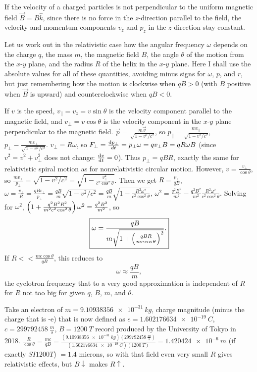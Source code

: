 If the velocity of a charged particles is not perpendicular to the uniform magnetic field $\vec{B} = B\hat{k}$, since there is no force in the $z$-direction parallel to the field, the velocity and momentum components $v_z$ and $p_z$ in the $z$-direction stay constant.

Let us work out in the relativistic case how the angular frequency $\omega$ depends on the charge $q$, the mass $m$, the magnetic field $B$, the angle $\theta$ of the motion from the $x$-$y$ plane, and the radius $R$ of the helix in the $x$-$y$ plane. Here I shall use the absolute values for all of these quantities, avoiding minus signs for $\omega$, $p$, and $r$, but just remembering how the motion is clockwise when $qB > 0$ (with $B$ positive when $\vec{B}$ is upward) and counterclockwise when $qB < 0$.

If $v$ is the speed, $v_{\parallel} = v_z = v\sin\theta$ is the velocity component parallel to the magnetic field, and $v_\bot = v\cos\theta$ is the velocity component in the $x$-$y$ plane perpendicular to the magnetic field. $\vec{p} = \frac{m\vec{v}}{\sqrt{1-v^2/c^2}}$, so $p_\parallel = \frac{mv_\parallel}{\sqrt{1 - v^2/c^2}}$, $p_\bot - \frac{mv_\bot}{\sqrt{1-v^2/c^2}}$. $v_\bot = R\omega$, so $F_\bot = \frac{\operatorname{d\!} p_\bot}{dt} = p_\bot \omega = qv_\bot B = qR\omega B$ (since $v^2 = v_\parallel^2 + v_\bot^2$ does not change: $\frac{\operatorname{d\!} v}{\operatorname{d\!} t} = 0$). Thus $p_\bot = qBR$, exactly the same for relativistic spiral motion as for nonrelativistic circular motion. However, $v = \frac{v_\bot}{\cos\theta}$, so $\frac{mv_\bot}{p_\bot} = \sqrt{ 1 - v^2/c^2 } = \sqrt{ 1 - \frac{v_\bot^2}{c^2\cos^2\theta} }$. Then we get $R = \frac{p_\bot}{qB}$, $\omega = \frac{v_\bot}{R} = \frac{qBv_\bot}{p_\bot} = \frac{qB}{m}\sqrt{1 - v^2/c^2} = \frac{qB}{m}\sqrt{ 1 - \frac{R^2\omega^2}{c^2\cos^2\theta} }$, $\omega^2 = \frac{q^2B^2}{m^2} - \frac{q^2B^2}{m^2}\frac{R^2\omega^2}{c^2\cos^2\theta}$. Solving for $\omega^2$, $\left(  1 + \frac{q^2B^2R^2}{m^2c^2\cos^2\theta}  \right)\omega^2 = \frac{q^2B^2}{m^2}$, so
\begin{equation}
\boxed{ \omega = \dfrac{qB}{m\sqrt{ 1 + \left(\frac{qBR}{mc\cos\theta}\right)^2 }} . }
\end{equation}
If $R << \frac{mc\cos\theta}{qB}$, this reduces to
\begin{equation}
\omega \approx \dfrac{qB}{m},
\end{equation}
the cyclotron frequency that to a very good approximation is independent of $R$ for $R$ not too big for given $q$, $B$, $m$, and $\theta$.

Take an electron of $m = \SI{9.10938356e-31}{kg}$, charge magnitude (minus the charge that is -e) that is now defined as $e = \SI{1.602176634e-19}{C}$, $c = \SI{299792458}{\frac{m}{s}}$, $B = \SI{1200}{T}$ record produced by the University of Tokyo in 2018. $\frac{R}{\cos\theta} = \frac{mc}{qB} = \frac{(\SI{9.10938356e-31}{kg})(\SI{299792458}{\frac{m}{s}})}{(\SI{1.602176634e-19}{C})(\SI{1200}{T})} = \SI{1.420424e-6}{m}$ (if exactly $SI{1200}{T}$) $= 1.4$ microns, so with that field even very small $R$ gives relativistic effects, but $B\downarrow$ makes $R\uparrow$.

